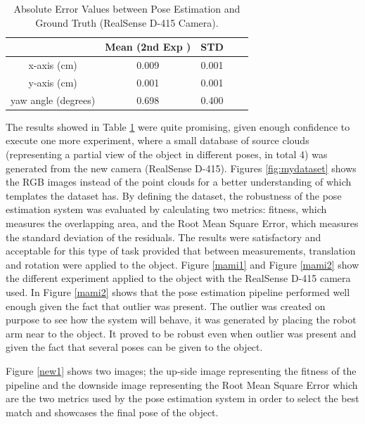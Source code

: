 \begin{table}[ht]
\renewcommand{\arraystretch}{1.3}
\caption{Absolute Error Values between Pose Estimation and Ground Truth (RealSense D-415 Camera).}
\label{absoluteRR}
\centering
\begin{tabular}{|c|c|c|c|c|}
\hline
  & Mean (2nd Exp )& STD \\
\hline
x-axis (cm) & 0.009 & 0.001
 \\
\hline
y-axis (cm) & 0.001 & 0.001  \\
\hline
yaw angle (degrees)& 0.698 & 0.400 \\
\hline
\end{tabular}
\end{table}

The results showed in Table \ref{absoluteRR} were quite promising, given enough confidence to execute one more experiment, where a small database of source clouds (representing a partial view of the object in different poses, in total 4) was generated from the new camera (RealSense D-415). Figures \ref{fig:mydataset} shows the RGB images instead of the point clouds for a better understanding of which templates the dataset has. By defining the dataset, the robustness of the pose estimation system was evaluated by calculating two metrics: fitness, which measures the overlapping area, and the Root Mean Square Error, which measures the standard deviation of the residuals. The results were satisfactory and acceptable for this type of task provided that between measurements, translation and rotation were applied to the object. Figure \ref{mami1} and Figure \ref{mami2} show the different experiment applied to the object with the RealSense D-415 camera used. In Figure \ref{mami2} shows that the pose estimation pipeline performed well enough given the fact that outlier was present. The outlier was created on purpose to see how the system will behave, it was generated by placing the robot arm near to the object. It proved to be robust even when outlier was present and given the fact that several poses can be given to the object.  


Figure \ref{new1} shows two images; the up-side image representing the fitness of the pipeline and the downside image representing the Root Mean Square Error which are the two metrics used by the pose estimation system in order to select the best match and showcases the final pose of the object.

